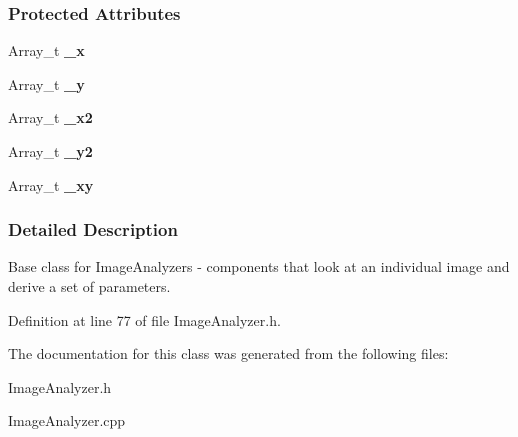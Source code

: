 \subsubsection*{Protected Attributes}
\begin{DoxyCompactItemize}
\item 
\hypertarget{classImageAnalyzer_a628d836cd9b04dfb4c14b230498274c0}{
Array\_\-t {\bfseries \_\-x}}
\label{classImageAnalyzer_a628d836cd9b04dfb4c14b230498274c0}

\item 
\hypertarget{classImageAnalyzer_a874a4fdc2fb1c726759f284dcdd66523}{
Array\_\-t {\bfseries \_\-y}}
\label{classImageAnalyzer_a874a4fdc2fb1c726759f284dcdd66523}

\item 
\hypertarget{classImageAnalyzer_ad42c24651b1898531e1c07e734c04aef}{
Array\_\-t {\bfseries \_\-x2}}
\label{classImageAnalyzer_ad42c24651b1898531e1c07e734c04aef}

\item 
\hypertarget{classImageAnalyzer_a544ebef59a5ee33364e44ffa35ab8f7d}{
Array\_\-t {\bfseries \_\-y2}}
\label{classImageAnalyzer_a544ebef59a5ee33364e44ffa35ab8f7d}

\item 
\hypertarget{classImageAnalyzer_acb41487bfeedcdb54f77592f96bbad2c}{
Array\_\-t {\bfseries \_\-xy}}
\label{classImageAnalyzer_acb41487bfeedcdb54f77592f96bbad2c}

\end{DoxyCompactItemize}


\subsubsection{Detailed Description}
Base class for ImageAnalyzers -\/ components that look at an individual image and derive a set of parameters. 

Definition at line 77 of file ImageAnalyzer.h.



The documentation for this class was generated from the following files:\begin{DoxyCompactItemize}
\item 
ImageAnalyzer.h\item 
ImageAnalyzer.cpp\end{DoxyCompactItemize}
